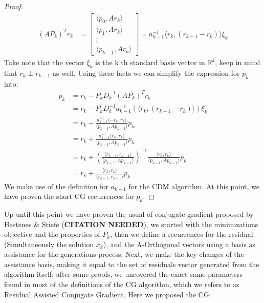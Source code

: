 \documentclass[]{article}
\theoremstyle{definition}
\begin{document}
\begin{proof}
                \begin{align}
                    (AP_k)^Tr_k &= 
                    \begin{bmatrix}
                        \langle p_0, Ar_k\rangle
                        \\
                        \langle p_1, Ar_k\rangle
                        \\
                        \vdots
                        \\
                        \langle p_{k - 1}, Ar_k\rangle
                    \end{bmatrix}
                    = 
                    a_{k - 1}^{-1}\langle r_k, (r_{k - 1} - r_{k})\rangle \xi_k
                \end{align}
                Take note that the vector $\xi_k$ is the k th standard basis vector in $\mathbb{R}^k$, keep in mind that $r_k\perp r_{k - 1}$ as well. Using these facts we can simplify the expression for $p_k$ into: 
                \begin{align}
                    p_k &= r_k - P_kD^{-1}_k(AP_k)^Tr_k
                    \\
                    &= r_k - P_kD_k^{-1}a_{k - 1}^{-1}(\langle r_k, (r_{k - 1} - r_{k})\rangle) \xi_k
                    \\
                    &= 
                    r_k - \frac{a_{k -1}^{-1}\langle -r_k, r_k\rangle}
                    {\langle p_{k - 1}, Ap_{k - 1}\rangle}p_k
                    \\
                    &= r_k + \frac{a_{k -1}^{-1}\langle r_k, r_k\rangle}
                    {\langle p_{k - 1}, Ap_{k - 1}\rangle}p_k
                    \\
                    &= r_k + 
                    \left(
                        \frac{\langle r_{k - 1}, r_{k - 1}\rangle}{\langle p_{k - 1}, Ap_{k - 1}\rangle}
                    \right)^{-1}
                    \frac{\langle r_k, r_k\rangle}{\langle p_{k - 1}, Ap_{k - 1}\rangle}p_k
                    \\
                    &= 
                    r_k + \frac{\langle r_k, r_k\rangle}{\langle r_{k - 1}, r_{k - 1}\rangle}p_k
                \end{align}
                We make use of the definition for $a_{k-1}$ for the CDM algorithm. At this point, we have proven the short CG recurrences for $p_k$. 
            \end{proof}
            Up until this point we have proven the usual of conjugate gradient proposed by Hestenes \& Stiefe (\textbf{CITATION NEEDED}), we started with the minimizations objective and the properties of $P_k$, then we define a recurrences for the residual (Simultaneously the solution $x_k$), and the A-Orthogonal vectors using a basis as assistance for the generations process. Next, we make the key changes of the assistance basis, making it equal to the set of residuals vector generated from the algorithm itself; after some proofs, we uncovered the exact same parameters found in most of the definitions of the CG algorithm, which we refers to as Residual Assisted Conjugate Gradient. Here we proposed the CG: 
\end{document}
